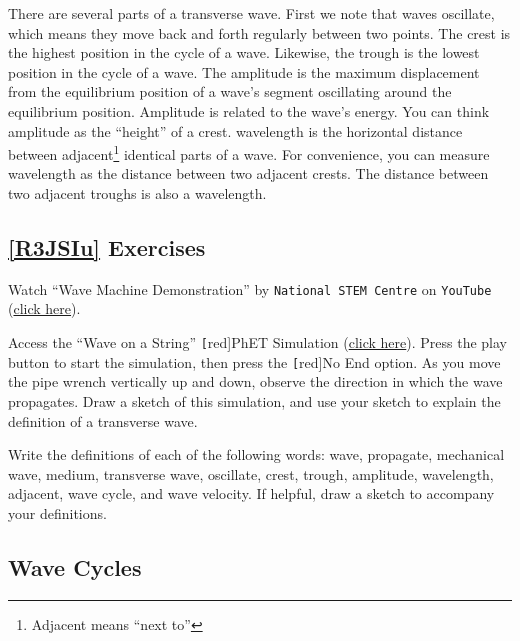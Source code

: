 \documentclass{article}
\numberwithin{equation}{section}
\numberwithin{figure}{section}
\begin{document}
There are several parts of a transverse wave. First we note that waves \gls{oscillate}, which means they move back and forth regularly between two points. The \gls{crest} is the highest position in the cycle of a wave. Likewise, the \gls{trough} is the lowest position in the cycle of a wave. The \gls{amplitude} is the maximum displacement from the equilibrium position of a wave's segment oscillating around the equilibrium position. Amplitude is related to the wave's energy. You can think amplitude as the ``height'' of a crest. \Gls{wavelength} is the horizontal distance between \gls{adjacent}\footnote{Adjacent means ``next to''} identical parts of a wave. For convenience, you can measure wavelength as the distance between two adjacent crests. The distance between two adjacent troughs is also a wavelength. 

\subsection*{\ref{R3JSIu} Exercises}

\begin{exercise}
    Watch ``Wave Machine Demonstration'' by \texttt{National STEM Centre} on \texttt{YouTube} (\href{https://youtu.be/VE520z_ugcU}{click here}).
\end{exercise}

\begin{exercise}
    Access the ``Wave on a String'' \texttt[red]{PhET Simulation} (\href{https://phet.colorado.edu/en/simulation/wave-on-a-string}{click here}). Press the play button to start the simulation, then press the \texttt[red]{No End} option. As you move the pipe wrench vertically up and down, observe the direction in which the wave propagates. Draw a sketch of this simulation, and use your sketch to explain the definition of a \gls{transverse wave}.
\end{exercise}

\begin{exercise}
    Write the definitions of each of the following words: wave, propagate, mechanical wave, medium, transverse wave, oscillate, crest, trough, amplitude, wavelength, adjacent, wave cycle, and wave velocity. If helpful, draw a sketch to accompany your definitions.
\end{exercise}

\cyanhrule


\subsection{Wave Cycles}\label{ZAl8Xb}
\end{document}
